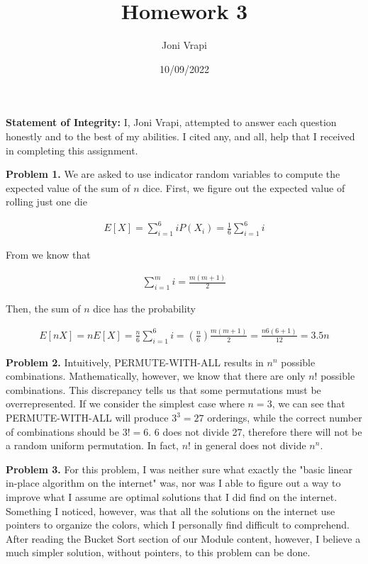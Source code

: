 \documentclass{article}
\title{Homework 3}
\author{Joni Vrapi}
\date{10/09/2022}
\begin{document}
\maketitle

\textbf{Statement of Integrity:} I, Joni Vrapi, attempted to answer each question honestly and to the best of my abilities. I cited any, and all, help that I received in completing this assignment.

\hfill

\textbf{Problem 1.} We are asked to use indicator random variables to compute the expected value \cite{website:1} of the sum of $n$ dice. First, we figure out the expected value of rolling just one die

\begin{gather}
    E[X] = \sum_{i = 1}^{6}iP(X_i) = \frac{1}{6}\sum_{i = 1}^{6}i 
\end{gather}

From \cite{website:2} we know that

\begin{gather}
    \sum_{i = 1}^{m}i = \frac{m(m+1)}{2}
\end{gather}

Then, the sum of $n$ dice has the probability

\begin{gather}
    E[nX] = nE[X] = \frac{n}{6}\sum_{i = 1}^{6}i = (\frac{n}{6})\frac{m(m+1)}{2} = \frac{n6(6+1)}{12} = 3.5n
\end{gather}

\hfill

\textbf{Problem 2.} Intuitively, PERMUTE-WITH-ALL results in $n^n$ possible combinations. Mathematically, however, we know that there are only $n!$ possible combinations. This discrepancy tells us that some permutations must be overrepresented. If we consider the simplest case where $n = 3$, we can see that PERMUTE-WITH-ALL will produce $3^3 = 27$ orderings, while the correct number of combinations should be $3! = 6$. 6 does not divide 27, therefore there will not be a random uniform permutation. In fact, $n!$ in general does not divide $n^n$.

\hfill

\textbf{Problem 3.} For this problem, I was neither sure what exactly the "basic linear in-place algorithm on the internet" was, nor was I able to figure out a way to improve what I assume are optimal solutions that I did find on the internet. Something I noticed, however, was that all the solutions on the internet use pointers to organize the colors, which I personally find difficult to comprehend. After reading the Bucket Sort section of our Module content, however, I believe a much simpler solution, without pointers, to this problem can be done. 
\end{document}
